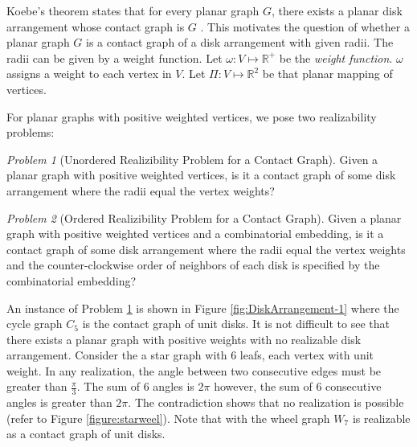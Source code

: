 \documentclass[10pt]{CSUNthesis}
\theoremstyle{plain}%
\theoremstyle{definition}
\theoremstyle{remark}
\newtheorem{prob}{Problem}
\newcommand{\bbR}{{\mathbb{R}}}
\newcommand{\bbr}{{\mathbb{R}}}
\begin{document}
Koebe's theorem states that for every planar graph $G$, there exists a planar disk arrangement whose contact graph is $G$ \cite{koebe1936kontaktprobleme}.
This motivates the question of whether a planar graph $G$ is a contact graph of a disk arrangement with given radii.
The radii can be given by a weight function.
Let $\omega: V \mapsto \bbR^+$ be the \textit{weight function}.  
$\omega$ assigns a weight to each vertex in $V$.  
Let $\Pi:V \mapsto \bbr^2$ be that planar mapping of vertices.

For planar graphs with positive weighted vertices, we pose two realizability problems:
\begin{prob}[Unordered Realizibility Problem for a Contact Graph]\label{problem:UnorderedContactGraph}
Given a planar graph with positive weighted vertices, is it a contact graph of some disk arrangement where the radii equal the vertex weights?
\end{prob}
\begin{prob}[Ordered Realizibility Problem for a Contact Graph]\label{problem:OrderedContactGraph}
Given a planar graph with positive weighted vertices and a combinatorial embedding, is it a contact graph of some disk arrangement where the radii equal the vertex weights and the counter-clockwise order of neighbors of each disk is specified by the combinatorial embedding?
\end{prob}

An instance of Problem \ref{problem:UnorderedContactGraph} is shown in Figure \ref{fig:DiskArrangement-1} where the cycle graph $C_5$ is the contact graph of unit disks.
It is not difficult to see that there exists a planar graph with positive weights with no realizable disk arrangement.
Consider the a star graph with 6 leafs, each vertex with unit weight.
In any realization, the angle between two consecutive edges must be greater than $\frac{\pi}{3}$. 
The sum of 6 angles is $2 \pi$ however, the sum of 6 consecutive angles is greater than $2\pi$.
The contradiction shows that no realization is possible (refer to Figure \ref{figure:starweel}).
Note that with the wheel graph $W_7$ is realizable as a contact graph of unit disks.
\end{document}
